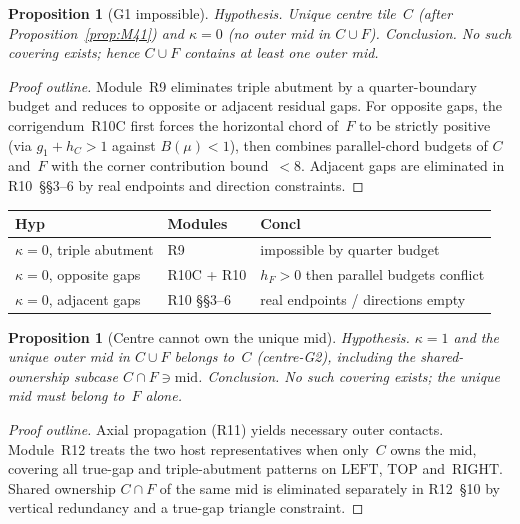 \documentclass[11pt,reqno]{amsart}
\newtheorem{proposition}[theorem]{Proposition}
\theoremstyle{definition}
\newcommand{\RIGHT}{\mathrm{RIGHT}}
\newcommand{\TOP}{\mathrm{TOP}}
\newcommand{\LEFT}{\mathrm{LEFT}}
\begin{document}


\begin{proposition}[G1 impossible]\label{prop:M42}
\emph{Hypothesis.} Unique centre tile~$C$ (after Proposition~\ref{prop:M41}) and
$\kappa=0$ (no outer mid in $C\cup F$).
\emph{Conclusion.} No such covering exists; hence $C\cup F$ contains at least
one outer mid.
\end{proposition}

\begin{proof}[Proof outline]
Module~R9 eliminates triple abutment by a quarter-boundary budget and reduces
to opposite or adjacent residual gaps.  For opposite gaps, the corrigendum~R10C
first forces the horizontal chord of~$F$ to be strictly positive (via
$g_1+h_C>1$ against $B(\mu)<1$), then combines parallel-chord budgets of $C$
and~$F$ with the corner contribution bound~$<8$.  Adjacent gaps are eliminated
in R10~\S\S3--6 by real endpoints and direction constraints.
\end{proof}

\begin{center}
\small
\begin{tabular}{@{}llp{}@{}}
\toprule
Hyp & Modules & Concl \\
\midrule
$\kappa=0$, triple abutment & R9 & impossible by quarter budget \\
$\kappa=0$, opposite gaps & R10C + R10 & $h_F>0$ then parallel budgets conflict \\
$\kappa=0$, adjacent gaps & R10 §§3--6 & real endpoints / directions empty \\
\bottomrule
\end{tabular}
\end{center}

\begin{proposition}[Centre cannot own the unique mid]\label{prop:M43}
\emph{Hypothesis.} $\kappa=1$ and the unique outer mid in $C\cup F$ belongs to~$C$
(centre-G2), including the shared-ownership subcase $C\cap F\ni\mathrm{mid}$.
\emph{Conclusion.} No such covering exists; the unique mid must belong to~$F$
alone.
\end{proposition}

\begin{proof}[Proof outline]
Axial propagation (R11) yields necessary outer contacts.  Module~R12 treats
the two host representatives when only~$C$ owns the mid, covering all true-gap
and triple-abutment patterns on $\LEFT$, $\TOP$ and~$\RIGHT$.  Shared ownership
$C\cap F$ of the same mid is eliminated separately in R12~\S10 by vertical
redundancy and a true-gap triangle constraint.
\end{proof}
\end{document}
